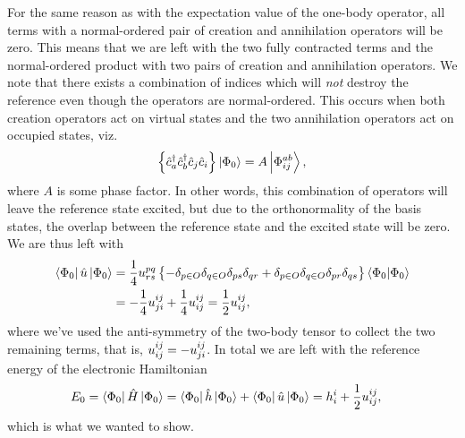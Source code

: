         For the same reason as with the expectation value of the one-body
        operator, all terms with a normal-ordered pair of creation and
        annihilation operators will be zero.
        This means that we are left with the two fully contracted terms and the
        normal-ordered product with two pairs of creation and annihilation
        operators.
        We note that there exists a combination of indices which will \emph{not}
        destroy the reference even though the operators are normal-ordered.
        This occurs when both creation operators act on virtual states and the
        two annihilation operators act on occupied states, viz.
        \begin{align}
            \left\{ 
                {\hat{c}_{a}^{\dagger}}
                {\hat{c}_{b}^{\dagger}}
                {\hat{c}_{j}}
                {\hat{c}_{i}}
             \right\}
            \ket{\Phi_{0}}
            = A\ket{\Phi^{ab}_{ij}},
        \end{align}
        where $A$ is some phase factor.
        In other words, this combination of operators will leave the reference
        state excited, but due to the orthonormality of the basis states, the
        overlap between the reference state and the excited state will be zero.
        We are thus left with
        \begin{align}
            \bra{\Phi_{0}}\hat{u}\ket{\Phi_{0}}
            &=
            \frac{1}{4}u^{pq}_{rs}\left\{ 
                -\delta_{p \in O}
                \delta_{q \in O}
                \delta_{ps}
                \delta_{qr}
                + \delta_{p \in O}
                \delta_{q \in O}
                \delta_{pr}
                \delta_{qs}
             \right\}\braket{\Phi_{0}}{\Phi_{0}}
            \\
            &=
            -\frac{1}{4} u^{ij}_{ji}
            + \frac{1}{4} u^{ij}_{ij}
            = \frac{1}{2} u^{ij}_{ij},
        \end{align}
        where we've used the anti-symmetry of the two-body tensor to collect the
        two remaining terms, that is, $u^{ij}_{ij} =-u^{ij}_{ji}$.
        In total we are left with the reference energy of the electronic
        Hamiltonian
        \begin{align}
            E_{0}
            &=
            \bra{\Phi_{0}}\hat{H}\ket{\Phi_{0}}
            =
            \bra{\Phi_{0}}\hat{h}\ket{\Phi_{0}}
            + \bra{\Phi_{0}}\hat{u}\ket{\Phi_{0}}
            =
            h^{i}_{i}
            + \frac{1}{2} u^{ij}_{ij},
        \end{align}
        which is what we wanted to show.


